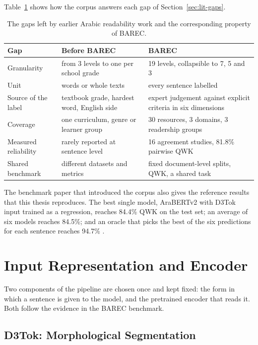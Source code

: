Table~\ref{tab:lit-gaps-barec} shows how the corpus answers each gap of
Section~\ref{sec:lit-gaps}.

\begin{table}[H]
\centering
\footnotesize
\caption{The gaps left by earlier Arabic readability work and the corresponding property of
BAREC.}
\label{tab:lit-gaps-barec}
\begin{tabular}{p{2.8cm} p{4.0cm} p{4.6cm}}
\toprule
\textbf{Gap} & \textbf{Before BAREC} & \textbf{BAREC} \\
\midrule
Granularity & from 3 levels to one per school grade & 19 levels, collapsible to 7, 5 and 3 \\
Unit & words or whole texts & every sentence labelled \\
Source of the label & textbook grade, hardest word, English side & expert judgement against
explicit criteria in six dimensions \\
Coverage & one curriculum, genre or learner group & 30 resources, 3 domains, 3 readership
groups \\
Measured reliability & rarely reported at sentence level & 16 agreement studies, 81.8\% pairwise
QWK \\
Shared benchmark & different datasets and metrics & fixed document-level splits, QWK, a shared
task \\
\bottomrule
\end{tabular}
\end{table}

The benchmark paper that introduced the corpus also gives the reference results that this thesis
reproduces. The best single model, AraBERTv2 with D3Tok input trained as a regression, reaches
84.4\% QWK on the test set; an average of six models reaches 84.5\%; and an oracle that picks the
best of the six predictions for each sentence reaches 94.7\% \cite{elmadani2025barec}.

\section{Input Representation and Encoder}
\label{sec:lit-input}

Two components of the pipeline are chosen once and kept fixed: the form in which a sentence is
given to the model, and the pretrained encoder that reads it. Both follow the evidence in the
BAREC benchmark.

\subsection{D3Tok: Morphological Segmentation}


